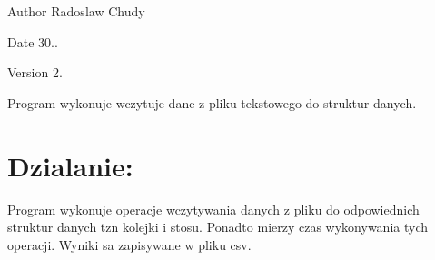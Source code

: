 \begin{DoxyAuthor}{Author}
Radoslaw Chudy 
\end{DoxyAuthor}
\begin{DoxyDate}{Date}
30.. 
\end{DoxyDate}
\begin{DoxyVersion}{Version}
2. \begin{DoxyVerb}Program wykonuje wczytuje dane z pliku tekstowego do struktur danych.
\end{DoxyVerb}

\end{DoxyVersion}
\hypertarget{index_etykieta-dzialanie}{}\section{Dzialanie\-:}\label{index_etykieta-dzialanie}
Program wykonuje operacje wczytywania danych z pliku do odpowiednich struktur danych tzn kolejki i stosu. Ponadto mierzy czas wykonywania tych operacji. Wyniki sa zapisywane w pliku csv. 